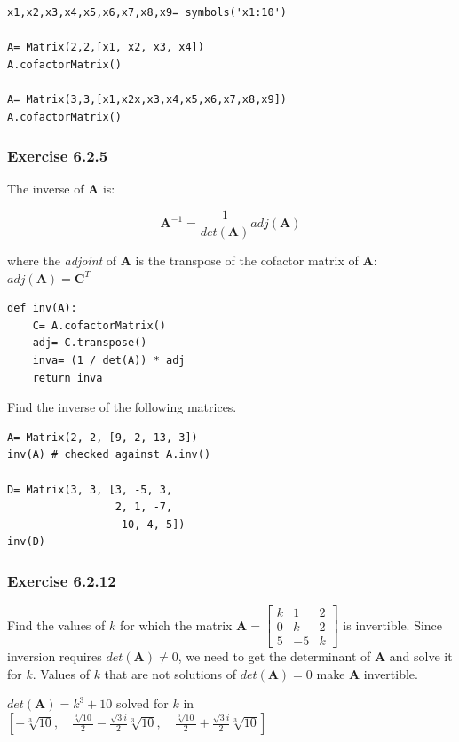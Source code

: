 \begin{verbatim}
x1,x2,x3,x4,x5,x6,x7,x8,x9= symbols('x1:10')

A= Matrix(2,2,[x1, x2, x3, x4])
A.cofactorMatrix()

A= Matrix(3,3,[x1,x2x,x3,x4,x5,x6,x7,x8,x9])
A.cofactorMatrix()
\end{verbatim}

\subsubsection{Exercise 6.2.5}

The inverse of \textbf{A} is:

$$
\mathbf{A}^{-1} = \frac{1}{det(\mathbf{A})} adj(\mathbf{A})
$$

where the \emph{adjoint} of \textbf{A} is the transpose of the cofactor matrix of \textbf{A}:
$adj(\mathbf{A}) = \mathbf{C}^T$

\begin{verbatim}
def inv(A):
    C= A.cofactorMatrix()
    adj= C.transpose()
    inva= (1 / det(A)) * adj
    return inva
\end{verbatim}

Find the inverse of the following matrices.

\begin{verbatim}
A= Matrix(2, 2, [9, 2, 13, 3])
inv(A) # checked against A.inv()

D= Matrix(3, 3, [3, -5, 3,
                 2, 1, -7,
                 -10, 4, 5])
inv(D)
\end{verbatim}

\subsubsection{Exercise 6.2.12}

Find the values of $k$ for which the matrix
$\mathbf{A} = \left[\begin{matrix}k & 1 & 2\\0 & k & 2\\5 & -5 & k\end{matrix}\right]$
is invertible. Since inversion requires $det(\mathbf{A}) \neq 0$, we need to get
the determinant of \textbf{A} and
solve it for $k$. Values of $k$ that are not solutions of $det(\mathbf{A}) = 0$ make
\textbf{A} invertible.

$det(\mathbf{A}) = k^3 + 10$ solved for $k$ in
$\left [ - \sqrt[3]{10}, \quad
\frac{\sqrt[3]{10}}{2} - \frac{\sqrt{3} i}{2} \sqrt[3]{10}, \quad
\frac{\sqrt[3]{10}}{2} + \frac{\sqrt{3} i}{2} \sqrt[3]{10}\right ]$


